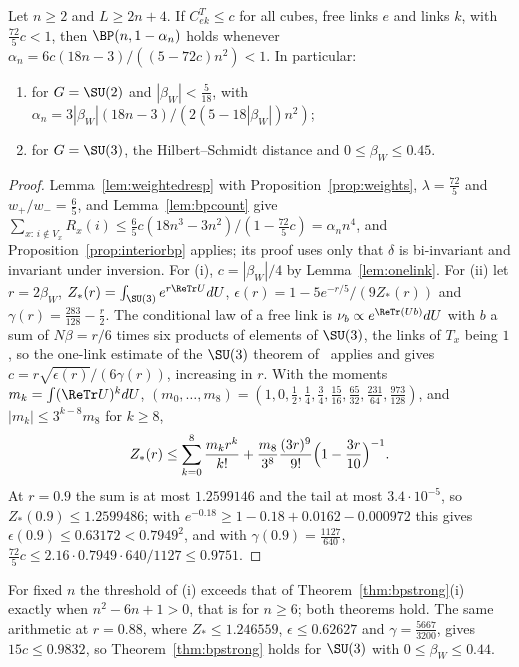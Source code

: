 \begin{theorem}\label{thm:bpweighted}
Let $n\ge2$ and $L\ge2n+4$. If $C^T_{ek}\le c$ for all cubes, free links $e$
and links $k$, with $\frac{72}5c<1$, then $\BP(n,1-\alpha_n)$ holds whenever
$\alpha_n=6c(18n-3)/((5-72c)n^2)<1$. In particular:
\begin{enumerate}[label=\textup{(\roman*)},leftmargin=*]
\item for $G=\SU(2)$ and $|\beta_W|<\frac5{18}$, with
$\alpha_n=3|\beta_W|(18n-3)/(2(5-18|\beta_W|)n^2)$;
\item for $G=\SU(3)$, the Hilbert--Schmidt distance and $0\le\beta_W\le0.45$.
\end{enumerate}
\end{theorem}

\begin{proof}
Lemma~\ref{lem:weightedresp} with Proposition~\ref{prop:weights},
$\lambda=\frac{72}5$ and $w_+/w_-=\frac65$, and Lemma~\ref{lem:bpcount} give
$\sum_{x:\,i\notin V_x}R_x(i)\le\frac65c(18n^3-3n^2)/(1-\frac{72}5c)=
\alpha_nn^4$, and Proposition~\ref{prop:interiorbp} applies; its proof uses
only that $\delta$ is bi-invariant and invariant under inversion. For (i),
$c=|\beta_W|/4$ by Lemma~\ref{lem:onelink}. For (ii) let $r=2\beta_W$,
$Z_*(r)=\int_{\SU(3)}e^{r\ReTr U}dU$, $\epsilon(r)=1-5e^{-r/5}/(9Z_*(r))$ and
$\gamma(r)=\frac{283}{128}-\frac r2$. The conditional law of a free link is
$\nu_b\propto e^{\ReTr(Ub)}dU$ with $b$ a sum of $N\beta=r/6$ times six
products of elements of $\SU(3)$, the links of $T_x$ being $1$, so the
one-link estimate of the $\SU(3)$ theorem of~\cite{BBLRS26} applies and gives
$c=r\sqrt{\epsilon(r)}/(6\gamma(r))$, increasing in $r$. With the moments
$m_k=\int(\ReTr U)^kdU$, $(m_0,\dots,m_8)=(1,0,\frac12,\frac14,\frac34,
\frac{15}{16},\frac{65}{32},\frac{231}{64},\frac{973}{128})$, and $|m_k|\le
3^{k-8}m_8$ for $k\ge8$,
\[
Z_*(r)\le\sum_{k=0}^8\frac{m_kr^k}{k!}+\frac{m_8}{3^8}\frac{(3r)^9}{9!}
\Bigl(1-\frac{3r}{10}\Bigr)^{-1}.
\]
At $r=0.9$ the sum is at most $1.2599146$ and the tail at most
$3.4\cdot10^{-5}$, so $Z_*(0.9)\le1.2599486$; with $e^{-0.18}\ge1-0.18+0.0162
-0.000972$ this gives $\epsilon(0.9)\le0.63172<0.7949^2$, and with
$\gamma(0.9)=\frac{1127}{640}$, $\frac{72}5c\le2.16\cdot0.7949\cdot640/1127
\le0.9751$.
\end{proof}

For fixed $n$ the threshold of (i) exceeds that of
Theorem~\ref{thm:bpstrong}(i) exactly when $n^2-6n+1>0$, that is for $n\ge6$;
both theorems hold. The same arithmetic at $r=0.88$, where $Z_*\le1.246559$,
$\epsilon\le0.62627$ and $\gamma=\frac{5667}{3200}$, gives $15c\le0.9832$, so
Theorem~\ref{thm:bpstrong} holds for $\SU(3)$ with $0\le\beta_W\le0.44$.

